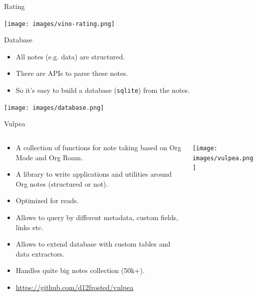 \documentclass[presentation,aspectratio=169,smaller]{beamer}
\begin{document}
\begin{frame}[label={sec:orgaa6f670}]{Rating}
\begin{center}
\texttt{[image: images/vino-rating.png]}
\end{center}
\end{frame}
\begin{frame}[label={sec:org82f4384},fragile]{Database}
 \begin{itemize}
\item All notes (e.g. data) are structured.
\item There are APIs to parse these notes.
\item So it's easy to build a database (\texttt{sqlite}) from the notes.
\end{itemize}

\begin{center}
\texttt{[image: images/database.png]}
\end{center}
\end{frame}
\begin{frame}[label={sec:orge77d27d}]{Vulpea}
\begin{columns}
\begin{column}{0.75\columnwidth}
\begin{itemize}
\item A collection of functions for note taking based on Org Mode and Org Roam.
\item A library to write applications and utilities around Org notes (structured or not).
\item Optimized for reads.
\item Allows to query by different metadata, custom fields, links etc.
\item Allows to extend database with custom tables and data extractors.
\item Handles quite big notes collection (50k+).
\item \url{https://github.com/d12frosted/vulpea}
\end{itemize}
\end{column}
\begin{column}{0.25\columnwidth}
\begin{center}
\texttt{[image: images/vulpea.png]}
\end{center}
\end{column}
\end{columns}
\end{frame}
\end{document}
